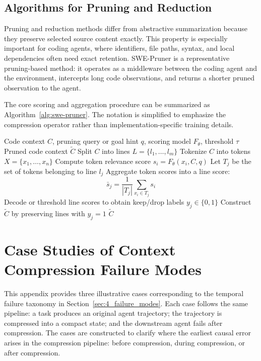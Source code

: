 \subsection{Algorithms for Pruning and Reduction}
\label{app:algorithms-pruning}

Pruning and reduction methods differ from abstractive summarization because they preserve selected source content exactly. This property is especially important for coding agents, where identifiers, file paths, syntax, and local dependencies often need exact retention. SWE-Pruner \citep{wang2026sweprunerselfadaptivecontextpruning} is a representative pruning-based method: it operates as a middleware between the coding agent and the environment, intercepts long code observations, and returns a shorter pruned observation to the agent.


The core scoring and aggregation procedure can be summarized as Algorithm~\ref{alg:swe-pruner}. The notation is simplified to emphasize the compression operator rather than implementation-specific training details.

\begin{algorithm}[t]
\small
\caption{Task-aware line-level pruning in SWE-Pruner}
\label{alg:swe-pruner}
\begin{algorithmic}[1]
\REQUIRE Code context $C$, pruning query or goal hint $q$, scoring model $F_{\theta}$, threshold $\tau$
\ENSURE Pruned code context $\tilde{C}$
\STATE Split $C$ into lines $L=\{l_1,\ldots,l_m\}$
\STATE Tokenize $C$ into tokens $X=\{x_1,\ldots,x_n\}$
    \STATE Compute token relevance score $s_i = F_{\theta}(x_i, C, q)$
\ENDFOR
{}
    \STATE Let $T_j$ be the set of tokens belonging to line $l_j$
    \STATE Aggregate token scores into a line score:
    \[
    \bar{s}_j = \frac{1}{|T_j|}\sum_{x_i \in T_j} s_i
    \]
\ENDFOR
\STATE Decode or threshold line scores to obtain keep/drop labels $y_j \in \{0,1\}$
\STATE Construct $\tilde{C}$ by preserving lines with $y_j=1$
\RETURN $\tilde{C}$
\end{algorithmic}
\end{algorithm}


\section{Case Studies of Context Compression Failure Modes}
\label{app:case-studies-compression-failures}

This appendix provides three illustrative cases corresponding to the temporal failure taxonomy in Section~\ref{sec:4_failure_modes}. 
Each case follows the same pipeline: a task produces an original agent trajectory; the trajectory is compressed into a compact state; and the downstream agent fails after compression. 
The cases are constructed to clarify where the earliest causal error arises in the compression pipeline: before compression, during compression, or after compression.

